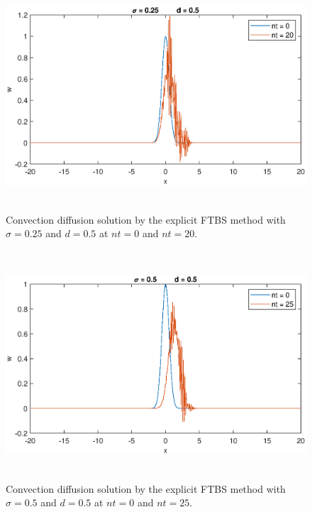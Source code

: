 \documentclass[letterpaper,12pt]{article}
\begin{document}
\begin{figure}[H] 
	\centering 
	\includegraphics[max height=8.5cm]{graphs/FTBS/ConvectionDiffusion/sigma025d05.eps}
	\caption{Convection diffusion solution by the explicit FTBS method with $\sigma= 0.25$ and $d=0.5$ at $nt=0$ and $nt=20$.}
	 \label{fig:FTBSsigma025d05}
\end{figure}
\vspace{1cm}
\begin{figure}[H] 
	\centering 
	\includegraphics[max height=8.5cm]{graphs/FTBS/ConvectionDiffusion/sigma05d05.eps}
	\caption{Convection diffusion solution by the explicit FTBS method with $\sigma= 0.5$ and $d=0.5$ at $nt=0$ and $nt=25$.}
	 \label{fig:FTBSsigma05d05}
\end{figure}
\newpage
\end{document}
